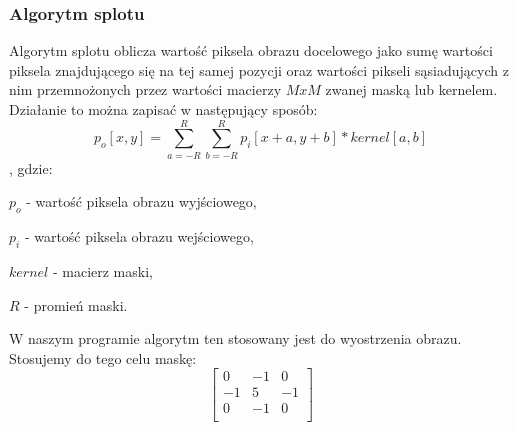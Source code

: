 \documentclass[twoside]{projektInzynierskiMS}
\begin{document}
\subsubsection{Algorytm splotu}
Algorytm splotu oblicza wartość piksela obrazu docelowego jako sumę wartości piksela znajdującego się na tej samej pozycji oraz wartości pikseli sąsiadujących z nim przemnożonych przez wartości macierzy $MxM$ zwanej maską lub kernelem. Działanie to można zapisać w następujący sposób: 
\[p_{o}[x,y]= \sum_{a = -R}^{R}\sum_{b = -R}^{R} p_{i}[x + a, y + b]*kernel[a, b]\], gdzie:

$p_{o}$ - wartość piksela obrazu wyjściowego,

$p_{i}$ - wartość piksela obrazu wejściowego,

$kernel$ - macierz maski,

$R$ - promień maski.

W naszym programie algorytm ten stosowany jest do wyostrzenia obrazu. Stosujemy do tego celu maskę: 
\[
\begin{bmatrix}
	0 & -1 & 0\\[0.3em]
	-1 & 5 & -1\\[0.3em]
	0 & -1 & 0\\[0.3em]
\end{bmatrix}
\]
\end{document}
